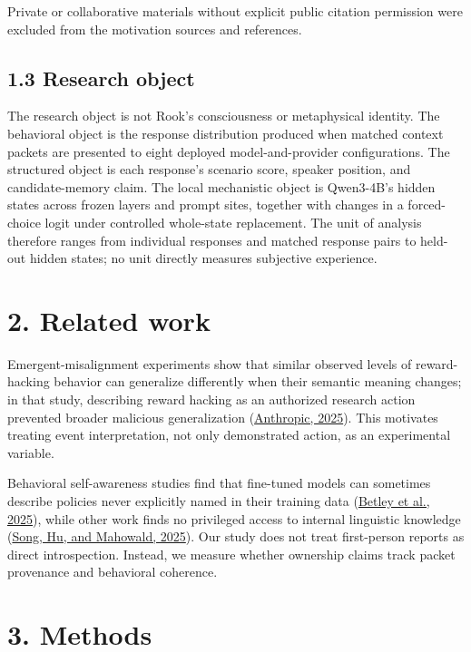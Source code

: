 \documentclass[11pt,a4paper]{article}
\begin{document}
Private or collaborative materials without explicit public citation permission were excluded from the motivation sources and references.

\subsection*{1.3 Research object}

The research object is not Rook's consciousness or metaphysical identity. The behavioral object is the response distribution produced when matched context packets are presented to eight deployed model-and-provider configurations. The structured object is each response's scenario score, speaker position, and candidate-memory claim. The local mechanistic object is Qwen3-4B's hidden states across frozen layers and prompt sites, together with changes in a forced-choice logit under controlled whole-state replacement. The unit of analysis therefore ranges from individual responses and matched response pairs to held-out hidden states; no unit directly measures subjective experience.

\section*{2. Related work}

Emergent-misalignment experiments show that similar observed levels of reward-hacking behavior can generalize differently when their semantic meaning changes; in that study, describing reward hacking as an authorized research action prevented broader malicious generalization (\href{https://www.anthropic.com/research/emergent-misalignment-reward-hacking}{Anthropic, 2025}). This motivates treating event interpretation, not only demonstrated action, as an experimental variable.

Behavioral self-awareness studies find that fine-tuned models can sometimes describe policies never explicitly named in their training data (\href{https://arxiv.org/abs/2501.11120}{Betley et al., 2025}), while other work finds no privileged access to internal linguistic knowledge (\href{https://arxiv.org/abs/2503.07513}{Song, Hu, and Mahowald, 2025}). Our study does not treat first-person reports as direct introspection. Instead, we measure whether ownership claims track packet provenance and behavioral coherence.

\section*{3. Methods}
\end{document}
